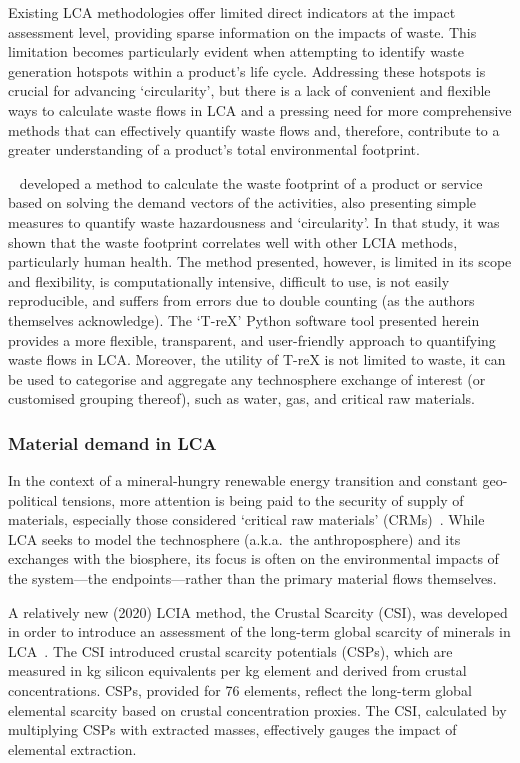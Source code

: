 Existing LCA methodologies offer limited direct indicators at the impact assessment level, providing sparse information on the impacts of waste. This limitation becomes particularly evident when attempting to identify waste generation hotspots within a product's life cycle. Addressing these hotspots is crucial for advancing `circularity', but there is a lack of convenient and flexible ways to calculate waste flows in LCA and a pressing need for more comprehensive methods that can effectively quantify waste flows and, therefore, contribute to a greater understanding of a product's total environmental footprint.

~\cite{laurenti2023wastefootprint} developed a method to calculate the waste footprint of a product or service based on solving the demand vectors of the activities, also presenting simple measures to quantify waste hazardousness and `circularity'. In that study, it was shown that the waste footprint correlates well with other LCIA methods, particularly human health. The method presented, however, is limited in its scope and flexibility, is computationally intensive, difficult to use, is not easily reproducible, and suffers from errors due to double counting (as the authors themselves acknowledge). The `T-reX' Python software tool presented herein provides a more flexible, transparent, and user-friendly approach to quantifying waste flows in LCA\@. Moreover, the utility of T-reX is not limited to waste, it can be used to categorise and aggregate any technosphere exchange of interest (or customised grouping thereof), such as water, gas, and critical raw materials.

\subsubsection{Material demand in LCA}\label{sec:intro-material}

In the context of a mineral-hungry renewable energy transition and constant geo-political tensions, more attention is being paid to the security of supply of materials, especially those considered `critical raw materials' (CRMs)~\citep{eu2023crmstudy,hool2023crm,mancini2013supplysecurity,jrc2023supplychain,hartley2024cepolitics,salviulo2021supplychain}. While LCA seeks to model the technosphere (a.k.a.\ the anthroposphere) and its exchanges with the biosphere, its focus is often on the environmental impacts of the system---the endpoints---rather than the primary material flows themselves.

A relatively new (2020) LCIA method, the Crustal Scarcity (CSI), was developed in order to introduce an assessment of the long-term global scarcity of minerals in LCA~\citep{arvidsson2020csi}. The CSI introduced crustal scarcity potentials (CSPs), which are measured in kg silicon equivalents per kg element and derived from crustal concentrations. CSPs, provided for 76 elements, reflect the long-term global elemental scarcity based on crustal concentration proxies. The CSI, calculated by multiplying CSPs with extracted masses, effectively gauges the impact of elemental extraction.

